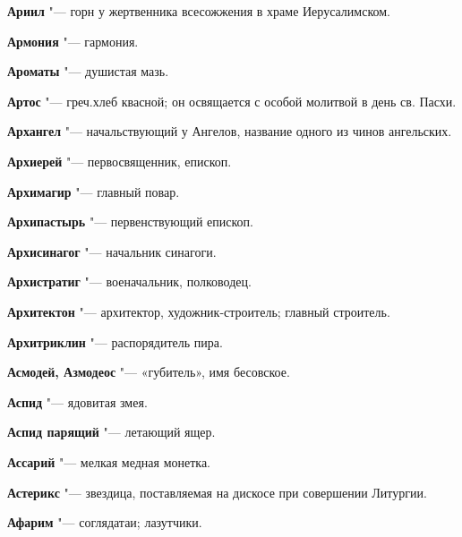 \begin{mymulticols}{2}
\noindent\textbf{Ариил} "--- горн у жертвенника всесожжения в храме Иерусалимском. 




\noindent\textbf{Армония} "--- гармония. 




\noindent\textbf{Ароматы} "--- душистая мазь. 




\noindent\textbf{Артос} "--- греч.хлеб квасной; он освящается с особой молитвой в день св. Пасхи. 




\noindent\textbf{Архангел} "--- начальствующий у Ангелов, название одного из чинов ангельских. 




\noindent\textbf{Архиерей} "--- первосвященник, епископ. 




\noindent\textbf{Архимагир} "--- главный повар. 




\noindent\textbf{Архипастырь} "--- первенствующий епископ. 




\noindent\textbf{Архисинагог} "--- начальник синагоги. 




\noindent\textbf{Архистратиг} "--- военачальник, полководец. 




\noindent\textbf{Архитектон} "--- архитектор, художник-строитель; главный строитель. 




\noindent\textbf{Архитриклин} "--- распорядитель пира. 




\noindent\textbf{Асмодей, Азмодеос} "--- «губитель», имя бесовское. 




\noindent\textbf{Аспид} "--- ядовитая змея. 




\noindent\textbf{Аспид парящий} "--- летающий ящер. 




\noindent\textbf{Ассарий} "--- мелкая медная монетка. 




\noindent\textbf{Астерикс} "--- звездица, поставляемая на дискосе при совершении Литургии. 




\noindent\textbf{Афарим} "--- соглядатаи; лазутчики. 





\end{mymulticols}
